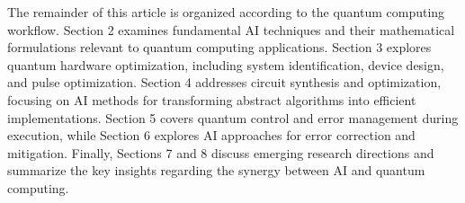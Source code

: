 The remainder of this article is organized according to the quantum computing workflow. Section 2 examines fundamental AI techniques and their mathematical formulations relevant to quantum computing applications. Section 3 explores quantum hardware optimization, including system identification, device design, and pulse optimization. Section 4 addresses circuit synthesis and optimization, focusing on AI methods for transforming abstract algorithms into efficient implementations. Section 5 covers quantum control and error management during execution, while Section 6 explores AI approaches for error correction and mitigation. Finally, Sections 7 and 8 discuss emerging research directions and summarize the key insights regarding the synergy between AI and quantum computing. 